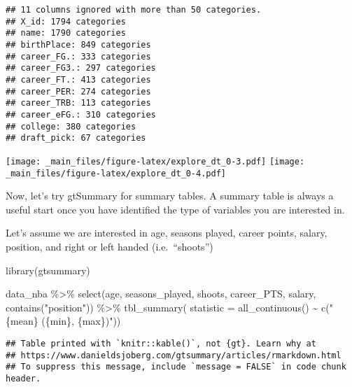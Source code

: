\documentclass[
]{book}
\newenvironment{Shaded}{\begin{snugshade}}{\end{snugshade}}
\newcommand{\AttributeTok}[1]{\textcolor[rgb]{0.77,0.63,0.00}{#1}}
\newcommand{\FunctionTok}[1]{\textcolor[rgb]{0.00,0.00,0.00}{#1}}
\newcommand{\NormalTok}[1]{#1}
\newcommand{\SpecialCharTok}[1]{\textcolor[rgb]{0.00,0.00,0.00}{#1}}
\newcommand{\StringTok}[1]{\textcolor[rgb]{0.31,0.60,0.02}{#1}}
\begin{document}
\begin{verbatim}
## 11 columns ignored with more than 50 categories.
## X_id: 1794 categories
## name: 1790 categories
## birthPlace: 849 categories
## career_FG.: 333 categories
## career_FG3.: 297 categories
## career_FT.: 413 categories
## career_PER: 274 categories
## career_TRB: 113 categories
## career_eFG.: 310 categories
## college: 380 categories
## draft_pick: 67 categories
\end{verbatim}

\texttt{[image: \_main\_files/figure-latex/explore\_dt\_0-3.pdf]} \texttt{[image: \_main\_files/figure-latex/explore\_dt\_0-4.pdf]}

Now, let's try gtSummary for summary tables. A summary table is always a useful start once you have identified the type of variables you are interested in.

Let's assume we are interested in age, seasons played, career points, salary,
position, and right or left handed (i.e.~``shoots'')

\begin{Shaded}
\begin{Highlighting}[]
\FunctionTok{library}\NormalTok{(gtsummary)}

\NormalTok{data\_nba }\SpecialCharTok{\%\textgreater{}\%} 
  \FunctionTok{select}\NormalTok{(age, seasons\_played, shoots, career\_PTS, salary, }\FunctionTok{contains}\NormalTok{(}\StringTok{"position"}\NormalTok{)) }\SpecialCharTok{\%\textgreater{}\%}
         \FunctionTok{tbl\_summary}\NormalTok{(}
           \AttributeTok{statistic =} \FunctionTok{all\_continuous}\NormalTok{() }\SpecialCharTok{\textasciitilde{}} \FunctionTok{c}\NormalTok{(}\StringTok{"\{mean\} (\{min\}, \{max\})"}\NormalTok{)) }
\end{Highlighting}
\end{Shaded}

\begin{verbatim}
## Table printed with `knitr::kable()`, not {gt}. Learn why at
## https://www.danieldsjoberg.com/gtsummary/articles/rmarkdown.html
## To suppress this message, include `message = FALSE` in code chunk header.
\end{verbatim}
\end{document}
